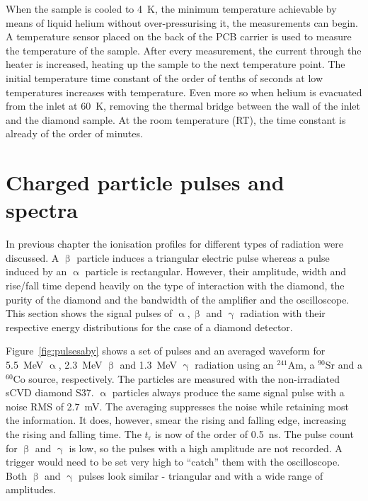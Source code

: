When the sample is cooled to 4~K, the minimum temperature achievable by means of liquid helium without over-pressurising it, the measurements can begin. A temperature sensor placed on the back of the PCB carrier is used to measure the temperature of the sample. After every measurement, the current through the heater is increased, heating up the sample to the next temperature point. The initial temperature time constant of the order of tenths of seconds at low temperatures increases with temperature. Even more so when helium is evacuated from the inlet at 60~K, removing the thermal bridge between the wall of the inlet and the diamond sample. At the room temperature (RT), the time constant is already of the order of minutes.

\section{Charged particle pulses and spectra}
\label{sec:pulsespectra}
In previous chapter the ionisation profiles for different types of radiation were discussed. A $\upbeta$ particle induces a triangular electric pulse whereas a pulse induced by an $\upalpha$ particle is rectangular. However, their amplitude, width and rise/fall time depend heavily on the type of interaction with the diamond, the purity of the diamond and the bandwidth of the amplifier and the oscilloscope. This section shows the signal pulses of $\upalpha, \upbeta$ and $\upgamma$ radiation with their respective energy distributions for the case of a diamond detector. %

Figure~\ref{fig:pulsesaby} shows a set of pulses and an averaged waveform for 5.5~MeV $\upalpha$, 2.3~MeV $\upbeta$ and 1.3~MeV $\upgamma$ radiation using an $^{241}$Am, a $^{90}$Sr and a $^{60}$Co source, respectively. The particles are measured with the non-irradiated sCVD diamond S37. $\upalpha$ particles always produce the same signal pulse with a noise RMS of 2.7~mV. The averaging suppresses the noise while retaining most the information. It does, however, smear the rising and falling edge, increasing the rising and falling time. The $t_{\mathrm{r}}$ is now of the order of 0.5~ns. The pulse count for $\upbeta$ and $\upgamma$ is low, so the pulses with a high amplitude are not recorded. A trigger would need to be set very high to ``catch'' them with the oscilloscope. Both $\upbeta$ and $\upgamma$ pulses look similar - triangular and with a wide range of amplitudes.

